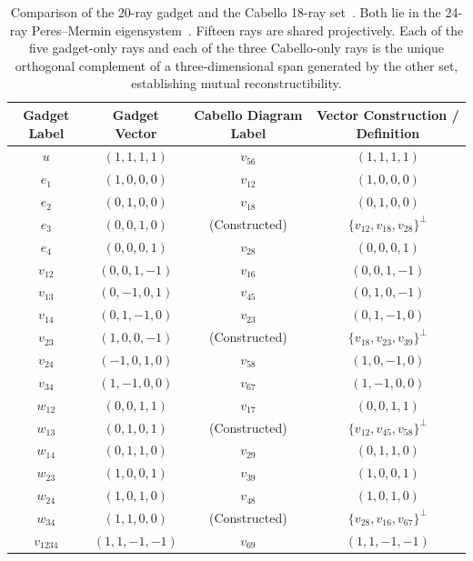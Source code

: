 \documentclass[%
  reprint,
  superscriptaddress,
  showpacs,
  showkeys,
  amsmath,amssymb,
  pra,
  longbibliography,
  floatfix,
  x11names
]{revtex4-2}
\newcommand{\rev}[1]{{\color{revisionblue}#1}}
\begin{document}
\begin{table}[ht]
\caption{\rev{Comparison of the 20-ray gadget and the Cabello 18-ray set~\cite{cabello-96,cabello:210401}.  Both lie in the 24-ray Peres--Mermin eigensystem~\cite{peres111,mermin90b,peres-91,pavicic-2004ksafq,svozil-2024-convert-pra-externalfigures}.  Fifteen rays are shared projectively.  Each of the five gadget-only rays and each of the three Cabello-only rays is the unique orthogonal complement of a three-dimensional span generated by the other set, establishing mutual reconstructibility.}}
\label{tab:vector-equivalence}
\begin{ruledtabular}
\begin{tabular}{cccc}
Gadget Label & Gadget Vector & Cabello Diagram Label & Vector Construction / Definition \\
\hline
$u$ & $(1,1,1,1)$ & $v_{56}$ & $(1,1,1,1)$ \\
$e_1$ & $(1,0,0,0)$ & $v_{12}$ & $(1,0,0,0)$ \\
$e_2$ & $(0,1,0,0)$ & $v_{18}$ & $(0,1,0,0)$ \\
$e_3$ & $(0,0,1,0)$ & (Constructed) & $\{v_{12}, v_{18}, v_{28}\}^\perp$ \\
$e_4$ & $(0,0,0,1)$ & $v_{28}$ & $(0,0,0,1)$ \\
\hline
$v_{12}$ & $(0,0,1,-1)$ & $v_{16}$ & $(0,0,1,-1)$ \\
$v_{13}$ & $(0,-1,0,1)$ & $v_{45}$ & $(0,1,0,-1)$ \\
$v_{14}$ & $(0,1,-1,0)$ & $v_{23}$ & $(0,1,-1,0)$ \\
$v_{23}$ & $(1,0,0,-1)$ & \rev{(Constructed)} & \rev{$\{v_{18},v_{23},v_{39}\}^\perp$} \\
$v_{24}$ & $(-1,0,1,0)$ & $v_{58}$ & $(1,0,-1,0)$ \\
$v_{34}$ & $(1,-1,0,0)$ & $v_{67}$ & $(1,-1,0,0)$ \\
\hline
$w_{12}$ & $(0,0,1,1)$ & $v_{17}$ & $(0,0,1,1)$ \\
$w_{13}$ & $(0,1,0,1)$ & \rev{(Constructed)} & \rev{$\{v_{12},v_{45},v_{58}\}^\perp$} \\
$w_{14}$ & $(0,1,1,0)$ & $v_{29}$ & $(0,1,1,0)$ \\
$w_{23}$ & $(1,0,0,1)$ & $v_{39}$ & $(1,0,0,1)$ \\
$w_{24}$ & $(1,0,1,0)$ & $v_{48}$ & $(1,0,1,0)$ \\
$w_{34}$ & $(1,1,0,0)$ & \rev{(Constructed)} & \rev{$\{v_{28},v_{16},v_{67}\}^\perp$} \\
\hline
$v_{1234}$ & $(1,1,-1,-1)$ & $v_{69}$ & $(1,1,-1,-1)$ \\

\end{tabular}
\end{ruledtabular}
\end{table}
\end{document}
